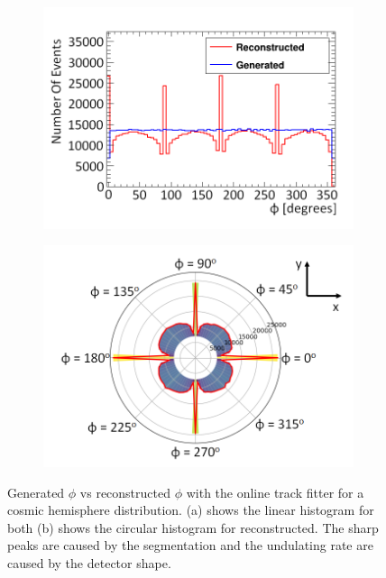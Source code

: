 \begin{figure}[!h]
\centering
\begin{subfigure}{.5\textwidth}
  \centering
  \includegraphics[width=\linewidth]{Chapter6/Figs/Raster/hemispherePhi_linHistMedText.png}
  \captionsetup{width=.9\linewidth}
  \caption{} 
  \label{subFig:phiGenVsRecoHem}
\end{subfigure}%
\begin{subfigure}{.5\textwidth}
  \centering
\includegraphics[width=\linewidth]{Chapter6/Figs/Raster/hemispherePhi_cirHistMedText.png}
  \captionsetup{width=.9\linewidth}
  \caption{}
  \label{subFig:cirPhiGenVsRecoHem}
\end{subfigure}
\caption[Generated $\phi$ vs reconstructed $\phi$ with the online track fitter.]{Generated $\phi$ vs reconstructed $\phi$ with the online track fitter for a cosmic hemisphere distribution. (a) shows the linear histogram for both (b) shows the circular histogram for reconstructed. The sharp peaks are caused by the segmentation and the undulating rate are caused by the detector shape.}
\label{fig:linCirPhiGenVsRecoHem}
\end{figure}

